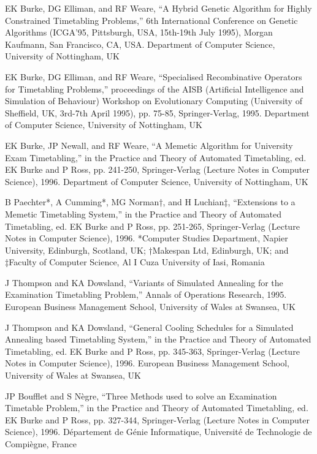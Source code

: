 \begin{thebibliography}{99}
EK Burke, DG Elliman, and RF Weare, “A Hybrid Genetic Algorithm for Highly Constrained Timetabling Problems,” 6th International Conference on Genetic Algorithms
(ICGA’95, Pittsburgh, USA, 15th-19th July 1995), Morgan Kaufmann, San Francisco,
CA, USA. Department of Computer Science, University of Nottingham, UK

EK Burke, DG Elliman, and RF Weare, “Specialised Recombinative Operators for Timetabling Problems,” proceedings of the AISB (Artificial Intelligence and Simulation
of Behaviour) Workshop on Evolutionary Computing (University of Sheffield, UK, 3rd-7th
April 1995), pp. 75-85, Springer-Verlag, 1995. Department of Computer Science,
University of Nottingham, UK

EK Burke, JP Newall, and RF Weare, “A Memetic Algorithm for University Exam
Timetabling,” in the Practice and Theory of Automated Timetabling, ed. EK Burke and
P Ross, pp. 241-250, Springer-Verlag (Lecture Notes in Computer Science), 1996.
Department of Computer Science, University of Nottingham, UK

B Paechter*, A Cumming*, MG Norman†, and H Luchian‡, “Extensions to a Memetic Timetabling System,” in the Practice and Theory of Automated Timetabling,
ed. EK Burke and P Ross, pp. 251-265, Springer-Verlag (Lecture Notes in Computer
Science), 1996. *Computer Studies Department, Napier University, Edinburgh,
Scotland, UK; †Makespan Ltd, Edinburgh, UK; and ‡Faculty of Computer Science,
Al I Cuza University of Iasi, Romania

J Thompson and KA Dowsland, “Variants of Simulated Annealing for the Examination
Timetabling Problem,” Annals of Operations Research, 1995. European Business
Management School, University of Wales at Swansea, UK

J Thompson and KA Dowsland, “General Cooling Schedules for a Simulated
Annealing based Timetabling System,” in the Practice and Theory of Automated Timetabling,
ed. EK Burke and P Ross, pp. 345-363, Springer-Verlag (Lecture Notes in Computer Science), 1996. European Business Management School, University of Wales at Swansea, UK

JP Boufflet and S N\`egre, “Three Methods used to solve an Examination Timetable
Problem,” in the Practice and Theory of Automated Timetabling, ed. EK Burke and P
Ross, pp. 327-344, Springer-Verlag (Lecture Notes in Computer Science), 1996.
D\'epartement de G\'enie Informatique, Universit\'e de Technologie de Compi\`egne, France


\end{thebibliography}

